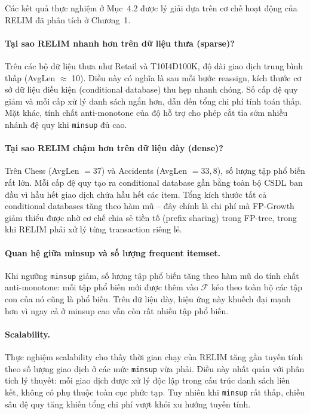 \documentclass[12pt,a4paper]{report}
\begin{document}
Các kết quả thực nghiệm ở Mục~4.2 được lý giải dựa trên cơ chế hoạt động của RELIM
đã phân tích ở Chương~1.

\paragraph{Tại sao RELIM nhanh hơn trên dữ liệu thưa (sparse)?}
Trên các bộ dữ liệu thưa như Retail và T10I4D100K, độ dài giao dịch trung bình thấp
(AvgLen $\approx$ 10). Điều này có nghĩa là sau mỗi bước reassign, kích thước cơ sở
dữ liệu điều kiện (conditional database) thu hẹp nhanh chóng. Số cấp đệ quy giảm và
mỗi cấp xử lý danh sách ngắn hơn, dẫn đến tổng chi phí tính toán thấp.
Mặt khác, tính chất anti-monotone của độ hỗ trợ cho phép cắt tỉa sớm nhiều nhánh
đệ quy khi \texttt{minsup} đủ cao.

\paragraph{Tại sao RELIM chậm hơn trên dữ liệu dày (dense)?}
Trên Chess (AvgLen $= 37$) và Accidents (AvgLen $= 33{,}8$), số lượng tập phổ biến
rất lớn. Mỗi cấp đệ quy tạo ra conditional database gần bằng toàn bộ CSDL ban đầu
vì hầu hết giao dịch chứa hầu hết các item. Tổng kích thước tất cả conditional
databases tăng theo hàm mũ -- đây chính là chi phí mà FP-Growth giảm thiểu được
nhờ cơ chế chia sẻ tiền tố (prefix sharing) trong FP-tree, trong khi RELIM phải
xử lý từng transaction riêng lẻ.

\paragraph{Quan hệ giữa minsup và số lượng frequent itemset.}
Khi ngưỡng \texttt{minsup} giảm, số lượng tập phổ biến tăng theo hàm mũ do tính
chất anti-monotone: mỗi tập phổ biến mới được thêm vào $\mathcal{F}$ kéo theo
toàn bộ các tập con của nó cũng là phổ biến. Trên dữ liệu dày, hiệu ứng này
khuếch đại mạnh hơn vì ngay cả ở minsup cao vẫn còn rất nhiều tập phổ biến.

\paragraph{Scalability.}
Thực nghiệm scalability cho thấy thời gian chạy của RELIM tăng gần tuyến tính theo
số lượng giao dịch ở các mức \texttt{minsup} vừa phải. Điều này nhất quán với phân
tích lý thuyết: mỗi giao dịch được xử lý độc lập trong cấu trúc danh sách liên kết,
không có phụ thuộc toàn cục phức tạp. Tuy nhiên khi \texttt{minsup} rất thấp, chiều
sâu đệ quy tăng khiến tổng chi phí vượt khỏi xu hướng tuyến tính.
\end{document}
